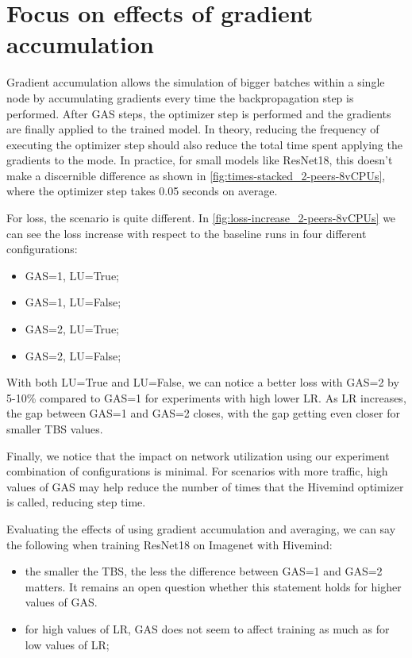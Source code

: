 \section{Focus on effects of gradient accumulation}

Gradient accumulation allows the simulation of bigger batches within a single node by accumulating gradients every time the backpropagation step is performed.
After GAS steps, the optimizer step is performed and the gradients are finally applied to the trained model.
In theory, reducing the frequency of executing the optimizer step should also reduce the total time spent applying the gradients to the mode.
In practice, for small models like ResNet18, this doesn't make a discernible difference as shown in \autoref{fig:times-stacked_2-peers-8vCPUs}, where the optimizer step takes 0.05 seconds on average.

For loss, the scenario is quite different.
In \autoref{fig:loss-increase_2-peers-8vCPUs} we can see the loss increase with respect to the baseline runs in four different configurations:
\begin{itemize}
    \item GAS=1, LU=True; 
    \item GAS=1, LU=False;
    \item GAS=2, LU=True;
    \item GAS=2, LU=False;
\end{itemize}

With both LU=True and LU=False, we can notice a better loss with GAS=2 by 5-10\% compared to GAS=1 for experiments with high lower LR.
As LR increases, the gap between GAS=1 and GAS=2 closes, with the gap getting even closer for smaller TBS values.

Finally, we notice that the impact on network utilization using our experiment combination of configurations is minimal.
For scenarios with more traffic, high values of GAS may help reduce the number of times that the Hivemind optimizer is called, reducing step time.

Evaluating the effects of using gradient accumulation and averaging, we can say the following when training ResNet18 on Imagenet with Hivemind:
\begin{itemize}
    \item the smaller the TBS, the less the difference between GAS=1 and GAS=2 matters. It remains an open question whether this statement holds for higher values of GAS.
    \item for high values of LR, GAS does not seem to affect training as much as for low values of LR;
\end{itemize}
